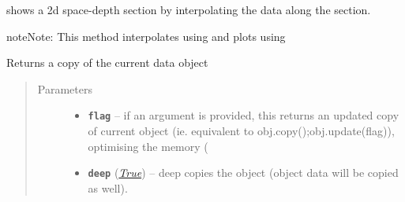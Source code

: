 \documentclass[letterpaper,10pt,english]{sphinxmanual}
\begin{document}
\begin{fulllineitems}
\begin{fulllineitems}
\end{fulllineitems}


\begin{fulllineitems}
\label{altimetry.data:altimetry.data.hydro_data.contour_transect}
shows a 2d space-depth section by interpolating the data along the section.

\begin{notice}{note}{Note:}
This method interpolates using  and plots using 
\end{notice}

\end{fulllineitems}


\begin{fulllineitems}
\label{altimetry.data:altimetry.data.hydro_data.copy}
Returns a copy of the current data object
\begin{quote}\begin{description}
\item[{Parameters}] \leavevmode\begin{itemize}
\item {} 
\textbf{\texttt{flag}} -- if an argument is provided, this returns an updated copy of current object (ie. equivalent to obj.copy();obj.update(flag)), optimising the memory (

\item {} 
\textbf{\texttt{deep}} (\href{http://docs.python.org/library/constants.html\#True}{\emph{True}}) -- deep copies the object (object data will be copied as well).

\end{itemize}

\end{description}\end{quote}

\end{fulllineitems}



\end{fulllineitems}
\end{document}
